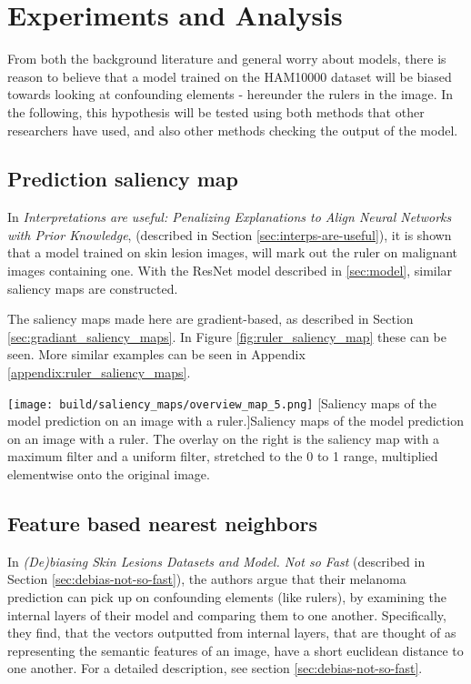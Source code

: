 \chapter{Experiments and Analysis}\label{sec:testing-the-hypothesis}
From both the background literature and general worry about models,
there is reason to believe that a model trained on the HAM10000 dataset will be biased
towards looking at confounding elements - hereunder the rulers in the image.
In the following, this hypothesis will be tested using both methods that other researchers have used,
and also other methods checking the output of the model.

\section{Prediction saliency map}\label{sec:prediction-saliency-map}
In \textit{Interpretations are useful: Penalizing Explanations to Align Neural Networks with Prior Knowledge}\cite{interps-are-useful},
(described in Section \ref{sec:interps-are-useful}), it is shown that a model trained on skin lesion images,
will mark out the ruler on malignant images containing one.
With the ResNet model described in \ref{sec:model}, similar saliency maps are constructed.

The saliency maps made here are gradient-based, as described in Section \ref{sec:gradiant_saliency_maps}.
In Figure \ref{fig:ruler_saliency_map} these can be seen.
More similar examples can be seen in Appendix \ref{appendix:ruler_saliency_maps}.

\begin{center}
    \texttt{[image: build/saliency\_maps/overview\_map\_5.png]}
    [Saliency maps of the model prediction on an image with a ruler.]{Saliency maps of the model prediction on an image with a ruler.
        The overlay on the right is the saliency map with a maximum filter and a uniform filter,
        stretched to the 0 to 1 range, multiplied elementwise onto the original image.
    }
    \label{fig:ruler_saliency_map}
\end{center}

\section{Feature based nearest neighbors}
In \textit{(De)biasing Skin Lesions Datasets and Model. Not so Fast}\cite{debias-not-so-fast} (described in Section \ref{sec:debias-not-so-fast}),
the authors argue that their melanoma prediction can pick up on confounding elements (like rulers),
by examining the internal layers of their model and comparing them to one another.
Specifically, they find, that the vectors outputted from internal layers,
that are thought of as representing the semantic features of an image,
have a short euclidean distance to one another.
For a detailed description, see section \ref{sec:debias-not-so-fast}.

